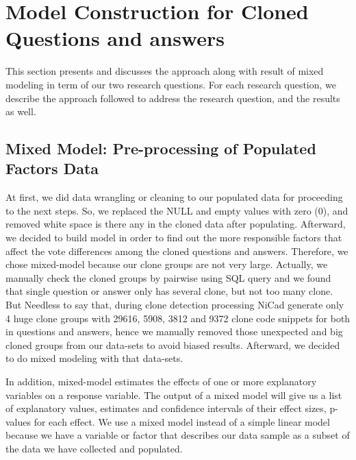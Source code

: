 \documentclass[conference]{IEEEtran}
\begin{document}
\section{Model Construction for Cloned Questions and answers}
This section presents and discusses the approach along with result of mixed modeling in term of our two research questions. For each research question, we describe the approach followed to address the research question, and the results as well.

\subsection{Mixed Model: Pre-processing of Populated Factors Data}
At first, we did data wrangling or cleaning to our populated data for proceeding to the next steps. So, we replaced the NULL and empty values with zero (0), and removed white space is there any in the cloned data after populating.  Afterward, we decided to build model in order to find out the more responsible factors that affect the vote differences among the cloned questions and answers. Therefore, we chose mixed-model because our clone groups are not very large. Actually, we manually check the cloned groups by pairwise using SQL query and we found that single question or answer only has several clone, but not too many clone. But Needless to say that, during clone detection processing NiCad generate only 4 huge clone groups with 29616, 5908, 3812 and 9372 clone code snippets for both in questions and answers, hence  we manually removed those unexpected and big cloned groups from our data-sets to avoid biased results. Afterward, we decided to do mixed modeling with that data-sets.

In addition,  mixed-model estimates the effects of one or more explanatory variables on a response variable. The output of a mixed model will give us a list of explanatory values, estimates and confidence intervals of their effect sizes, p-values for each effect. We use a mixed model instead of a simple linear model because we have a variable or factor that describes our data sample as a subset of the data we have collected and populated.  
\end{document}
